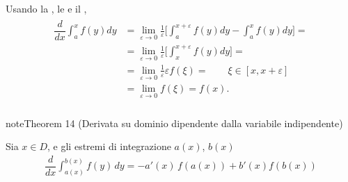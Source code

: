 \documentclass[letterpaper,10pt,italian]{jupyterBook}
\begin{document}
\sphinxAtStartPar
{} Usando la {\hyperref[\detokenize{ch/infinitesimal_calculus/derivatives:infinitesimal-calculus-derivatives-def}]{}}, le {\hyperref[\detokenize{ch/infinitesimal_calculus/integrals:infinitesimal-calculus-integrals-def-definite-prop}]{}} e il {\hyperref[\detokenize{ch/infinitesimal_calculus/integrals:infinitesimal-calculus-integrals-thm-avg}]{}},
\begin{equation*}
\begin{split}\begin{aligned}
\dfrac{d}{dx} \int_{a}^x f(y) dy & = \lim_{\varepsilon \rightarrow 0 }\frac{1}{\varepsilon} \Big[ \int_{a}^{x+\varepsilon} f(y) dy - \int_{a}^{x} f(y) dy \Big] = \\
& = \lim_{\varepsilon \rightarrow 0 }\frac{1}{\varepsilon} \Big[ \int_{x}^{x+\varepsilon} f(y) dy \Big] = \\
& = \lim_{\varepsilon \rightarrow 0 } \frac{1}{\varepsilon} \varepsilon f(\xi) = \qquad \xi \in [x,x+\varepsilon] \\
& = \lim_{\varepsilon \rightarrow 0 } f(\xi) = f(x) . \\
\end{aligned}\end{split}
\end{equation*}\label{ch/infinitesimal_calculus/integrals:integrals:thm:fund:reynolds}
\begin{sphinxadmonition}{note}{Theorem 14 (Derivata su dominio dipendente dalla variabile indipendente)}



\sphinxAtStartPar
Sia \(x \in D\), e gli estremi di integrazione \(a(x)\), \(b(x)\)  
\begin{equation*}
\begin{split}\dfrac{d}{dx} \int_{a(x)}^{b(x)} f(y) \, dy = - a'(x) \, f(a(x)) + b'(x) f(b(x)) \end{split}
\end{equation*}\end{sphinxadmonition}
\end{document}
